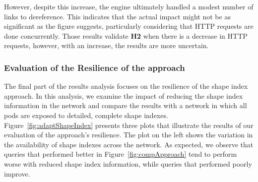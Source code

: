 However, despite this increase, the engine ultimately handled a modest number of links to dereference.
This indicates that the actual impact might not be as significant as the figure suggests, particularly considering that HTTP requests are done concurrently.
Those results validate \textbf{H2} when there is a decrease in HTTP requests, however, with an increase, the results are more uncertain.

\fi




\subsubsection{Evaluation of the Resilience of the approach}

The final part of the results analysis focuses on the resilience of the shape index approach.
In this analysis, we examine the impact of reducing the shape index information in the network and compare the results with a network in which all pods are exposed to detailed, complete shape indexes.
Figure~\ref{fig:adaptShapeIndex} presents three plots that illustrate the results of our evaluation of the approach's resilience.
The plot on the left shows the variation in the availability of shape indexes across the network. 
As expected, we observe that queries that performed better in Figure~\ref{fig:compApproach} tend to perform worse with reduced shape index information, while queries that performed poorly improve. 


